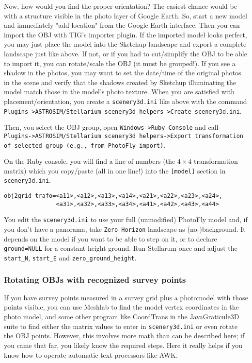 \documentclass[a4paper]{article}
\newcommand{\filename}[1]{\texttt{#1}}
\newcommand{\cmd}[1]{\texttt{#1}}
\begin{document}
Now, how would you find the proper orientation? The easiest chance
would be with a structure visible in the photo layer of Google
Earth. So, start a new model and immediately "add location" from the
Google Earth interface. Then you can import the OBJ with TIG's importer
plugin.  If the imported model looks perfect, you may just place the
model into the Sketchup landscape and export a complete landscape just
like above. If not, or if you had to cut/simplify the OBJ to be able
to import it, you can rotate/scale the OBJ (it must be grouped!). If
you see a shadow in the photos, you may want to set the date/time of
the original photos in the scene and verify that the shadows created by
Sketchup illuminating the model match those in the model's photo
texture. When you are satisfied with placement/orientation, you create
a \filename{scenery3d.ini} like above with the command
\cmd{Plugins->ASTROSIM/Stellarium scenery3d helpers->Create scenery3d.ini}.

Then, you select the OBJ group, open \cmd{Windows->Ruby Console} and call
\cmd{Plugins->ASTROSIM/Stellarium scenery3d helpers->Export transformation
of selected group (e.g., from PhotoFly import)}.

On the Ruby console, you will find a line of numbers (the $4\times4$
transformation matrix) which you copy/paste (all in one line!) into the
\filename{[model]} section in \filename{scenery3d.ini}.
\begin{verbatim}
obj2grid_trafo=<a11>,<a12>,<a13>,<a14>,<a21>,<a22>,<a23>,<a24>,
               <a31>,<a32>,<a33>,<a34>,<a41>,<a42>,<a43>,<a44>
\end{verbatim}
You edit the \filename{scenery3d.ini} to use your full (unmodified)
PhotoFly model and, if you don't have a panorama, take \filename{Zero Horizon}
landscape as (no-)background. It depends on the model if you want to
be able to step on it, or to declare \verb|ground=NULL| for a
constant-height ground. Run Stellarum once and adjust the
\verb|start_N|, \verb|start_E| and \verb|zero_ground_height|.

\subsubsection{Rotating OBJs with recognized survey points}
\label{sec:RotatingOBJ}

If you have survey points measured in a survey grid plus a photomodel
with those points visible, you can use Meshlab to find the model
vertex coordinates in the photo model, and some other program like
CoordTrans in the JavaGraticule3D suite to find either the matrix
values to enter in \filename{scenery3d.ini} or even rotate the OBJ
points. However, this involves more math than can be described here;
if you came that far, you likely know the required steps.  Here it
really helps if you know how to operate automatic text processors like
AWK.
\end{document}
